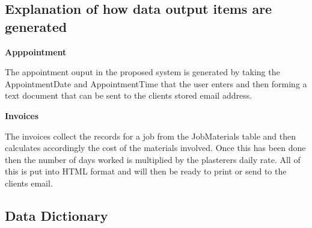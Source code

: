 \subsection{Explanation of how data output items are generated}

\textbf{Apppointment}
\begin{flushleft}
The appointment ouput in the proposed system is generated by taking the AppointmentDate and AppointmentTime that the user enters and then forming a text document that can be sent to the clients stored email address.
\end{flushleft}

\textbf{Invoices}
\begin{flushleft}
The invoices collect the records for a job from the JobMaterials table and then calculates accordingly the cost of the materials involved. Once this has been done then the number of days worked is multiplied by the plasterers daily rate. All of this is put into HTML format and will then be ready to print or send to the clients email.
\end{flushleft}


\pagebreak
\subsection{Data Dictionary}


